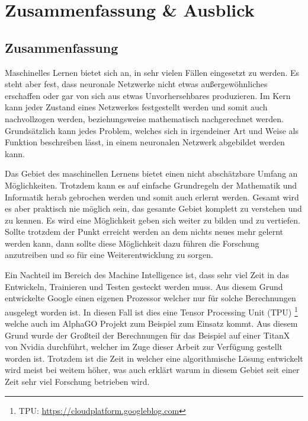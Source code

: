 \chapter{Zusammenfassung \& Ausblick}
\label{cha:ZusammenfassungAusblick}

\section{Zusammenfassung}

\noindent
Maschinelles Lernen bietet sich an, in sehr vielen Fällen eingesetzt zu werden. 
Es steht aber fest, dass neuronale Netzwerke nicht etwas außergewöhnliches erschaffen oder gar von sich aus etwas Unvorhersehbares produzieren. 
Im Kern kann jeder Zustand eines Netzwerkes festgestellt werden und somit auch nachvollzogen werden, beziehungsweise mathematisch nachgerechnet werden. 
Grundsätzlich kann jedes Problem, welches sich in irgendeiner Art und Weise als Funktion beschreiben lässt, in einem neuronalen Netzwerk abgebildet werden kann. \newline

\noindent
Das Gebiet des maschinellen Lernens bietet einen nicht abschätzbare Umfang an Möglichkeiten. 
Trotzdem kann es auf einfache Grundregeln der Mathematik und Informatik herab gebrochen werden und somit auch erlernt werden. 
Gesamt wird es aber praktisch nie möglich sein, das gesamte Gebiet komplett zu verstehen und zu kennen.
Es wird eine Möglichkeit geben sich weiter zu bilden und zu vertiefen. 
Sollte trotzdem der Punkt erreicht werden an dem nichts neues mehr gelernt werden kann, dann sollte diese Möglichkeit dazu führen die Forschung anzutreiben und so für eine Weiterentwicklung zu sorgen. \newline

\noindent
Ein Nachteil im Bereich des Machine Intelligence ist, dass sehr viel Zeit in das Entwickeln, Trainieren und Testen gesteckt werden muss. 
Aus diesem Grund entwickelte Google einen eigenen Prozessor welcher nur für solche Berechnungen ausgelegt worden ist. 
In diesen Fall ist dies eine Tensor Processing Unit (TPU) \footnote{TPU: \url{https://cloudplatform.googleblog.com}} welche auch im AlphaGO Projekt zum Beispiel zum Einsatz kommt. 
Aus diesem Grund wurde der Großteil der Berechnungen für das Beispiel auf einer TitanX von Nvidia durchführt, welcher im Zuge dieser Arbeit zur Verfügung gestellt worden ist. 
Trotzdem ist die Zeit in welcher eine algorithmische Lösung entwickelt wird meist bei weitem höher, was auch erklärt warum in diesem Gebiet seit einer Zeit sehr viel Forschung betrieben wird. 

